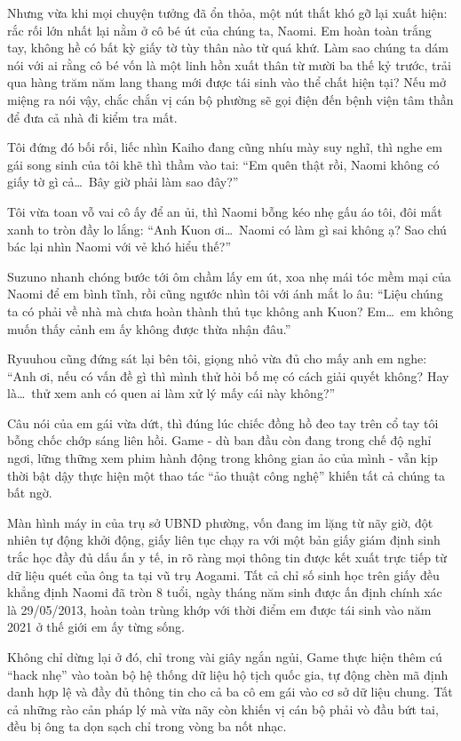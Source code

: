 ﻿\documentclass[../main.tex]{subfiles}
\begin{document}
Nhưng vừa khi mọi chuyện tưởng đã ổn thỏa, một nút thắt khó gỡ lại xuất hiện: rắc rối lớn nhất lại nằm ở cô bé út của chúng ta, Naomi. Em hoàn toàn trắng tay, không hề có bất kỳ giấy tờ tùy thân nào từ quá khứ. Làm sao chúng ta dám nói với ai rằng cô bé vốn là một linh hồn xuất thân từ mười ba thế kỷ trước, trải qua hàng trăm năm lang thang mới được tái sinh vào thể chất hiện tại? Nếu mở miệng ra nói vậy, chắc chắn vị cán bộ phường sẽ gọi điện đến bệnh viện tâm thần để đưa cả nhà đi kiểm tra mất.

Tôi đứng đó bối rối, liếc nhìn Kaiho đang cũng nhíu mày suy nghĩ, thì nghe em gái song sinh của tôi khẽ thì thầm vào tai: ``Em quên thật rồi, Naomi không có giấy tờ gì cả\dots\ Bây giờ phải làm sao đây?''

Tôi vừa toan vỗ vai cô ấy để an ủi, thì Naomi bỗng kéo nhẹ gấu áo tôi, đôi mắt xanh to tròn đầy lo lắng: ``Anh Kuon ơi\dots\ Naomi có làm gì sai không ạ? Sao chú bác lại nhìn Naomi với vẻ khó hiểu thế?''

Suzuno nhanh chóng bước tới ôm chầm lấy em út, xoa nhẹ mái tóc mềm mại của Naomi để em bình tĩnh, rồi cũng ngước nhìn tôi với ánh mắt lo âu: ``Liệu chúng ta có phải về nhà mà chưa hoàn thành thủ tục không anh Kuon? Em\dots\ em không muốn thấy cảnh em ấy không được thừa nhận đâu.''

Ryuuhou cũng đứng sát lại bên tôi, giọng nhỏ vừa đủ cho mấy anh em nghe: ``Anh ơi, nếu có vấn đề gì thì mình thử hỏi bố mẹ có cách giải quyết không? Hay là\dots\ thử xem anh có quen ai làm xử lý mấy cái này không?''

Câu nói của em gái vừa dứt, thì đúng lúc chiếc đồng hồ đeo tay trên cổ tay tôi bỗng chốc chớp sáng liên hồi. Game - dù ban đầu còn đang trong chế độ nghỉ ngơi, lững thững xem phim hành động trong không gian ảo của mình - vẫn kịp thời bật dậy thực hiện một thao tác ``ảo thuật công nghệ'' khiến tất cả chúng ta bất ngờ.

Màn hình máy in của trụ sở UBND phường, vốn đang im lặng từ nãy giờ, đột nhiên tự động khởi động, giấy liên tục chạy ra với một bản giấy giám định sinh trắc học đầy đủ dấu ấn y tế, in rõ ràng mọi thông tin được kết xuất trực tiếp từ dữ liệu quét của ông ta tại vũ trụ Aogami. Tất cả chỉ số sinh học trên giấy đều khẳng định Naomi đã tròn 8 tuổi, ngày tháng năm sinh được ấn định chính xác là 29/05/2013, hoàn toàn trùng khớp với thời điểm em được tái sinh vào năm 2021 ở thế giới em ấy từng sống.

Không chỉ dừng lại ở đó, chỉ trong vài giây ngắn ngủi, Game thực hiện thêm cú ``hack nhẹ'' vào toàn bộ hệ thống dữ liệu hộ tịch quốc gia, tự động chèn mã định danh hợp lệ và đầy đủ thông tin cho cả ba cô em gái vào cơ sở dữ liệu chung. Tất cả những rào cản pháp lý mà vừa nãy còn khiến vị cán bộ phải vò đầu bứt tai, đều bị ông ta dọn sạch chỉ trong vòng ba nốt nhạc.
\end{document}

